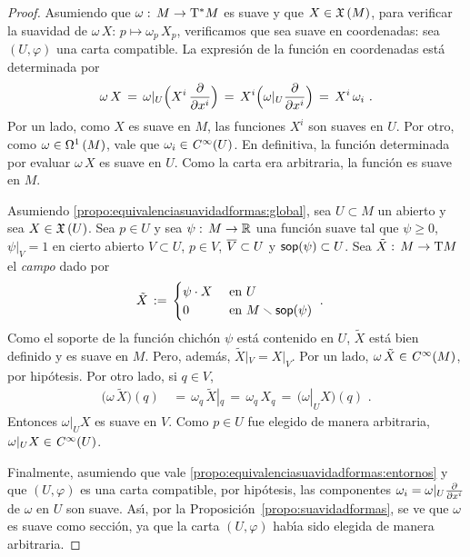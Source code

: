 \begin{proof}
	Asumiendo que $\omega:\,M\rightarrow\tangente*{M}$ es suave y que
	$X\in\champs M$, para verificar la suavidad de
	\begin{math}
		\omega\,X:\,p\mapsto\omega_p\,X_p
	\end{math}, verificamos que sea suave en coordenadas: sea $(U,\varphi)$
	una carta compatible. La expresi\'{o}n de la funci\'{o}n en coordenadas
	est\'{a} determinada por
	\begin{equation}\label{eq:formacampoencoordenadas}
		\omega\,X \,=\,\omega|_U\Big(X^i\,\gancho{x^i}\Big) \,=\,
			X^i\Big(\omega|_U\gancho{x^i}\Big) \,=\,
			X^i\,\omega_i
		\text{ .}
	\end{equation}
	Por un lado, como $X$ es suave en $M$, las funciones $X^i$ son suaves
	en $U$. Por otro, como $\omega\in\formes[1]{M}$, vale que
	$\omega_i\in\suaves U$. En definitiva, la funci\'{o}n determinada por
	evaluar $\omega\,X$ es suave en $U$. Como la carta era arbitraria, la
	funci\'{o}n es suave en $M$.

	Asumiendo \ref{propo:equivalenciasuavidadformas:global}, sea
	$U\subset M$ un abierto y sea $X\in\champs U$. Sea $p\in U$ y sea
	$\psi:\,M\rightarrow\bb R$ una funci\'{o}n suave tal que
	$\psi\geq 0$, $\psi|_V=1$ en cierto abierto $V\subset U$,
	$p\in V$, $\clos V\subset U$ y $\soporte{\psi}\subset U$. Sea
	$\tilde X:\,M\rightarrow\tangente M$ el \emph{campo} dado por
	\begin{align*}
		\tilde X & \,:=\,
			\begin{cases}
				\psi\cdot X & \text{ en } U \\
				0 & \text{ en } M\setmin\soporte{\psi}
			\end{cases}
		\text{ .}
	\end{align*}
	Como el soporte de la funci\'{o}n chich\'{o}n $\psi$ est\'{a} contenido
	en $U$, $\tilde X$ est\'{a} bien definido y es suave en $M$. Pero,
	adem\'{a}s, $\tilde X|_V=X|_V$. Por un lado,
	$\omega\,\tilde X\in\suaves M$, por hip\'{o}tesis. Por otro lado, si
	$q\in V$,
	\begin{align*}
		\big(\omega\,\tilde X\big)(q) & \,=\,
			\omega_q\,\tilde X|_q \,=\,
			\omega_q\,X_q \,=\,\big(\omega|_UX\big)(q)
		\text{ .}
	\end{align*}
	Entonces $\omega|_UX$ es suave en $V$. Como $p\in U$ fue elegido de
	manera arbitraria, $\omega|_UX\in\suaves U$.

	Finalmente, asumiendo que vale
	\ref{propo:equivalenciasuavidadformas:entornos} y que $(U,\varphi)$ es
	una carta compatible, por hip\'{o}tesis, las componentes
	$\omega_i=\omega|_U\gancho{x^i}$ de $\omega$ en $U$ son suave.
	As\'{\i}, por la Proposici\'{o}n~\ref{propo:suavidadformas}, se ve que
	$\omega$ es suave como secci\'{o}n, ya que la carta $(U,\varphi)$
	hab\'{\i}a sido elegida de manera arbitraria.
\end{proof}
